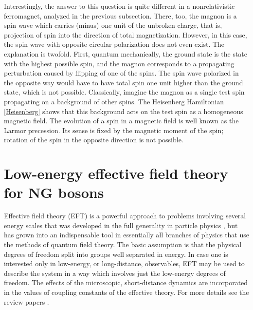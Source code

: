 \documentclass[final,3p,times,12pt,a4paper,sort&compress]{elsarticle}
\begin{document}
Interestingly, the answer to this question is quite different in a
nonrelativistic ferromagnet, analyzed in the previous subsection. There, too,
the magnon is a spin wave which carries (minus) one unit of the unbroken
charge, that is, projection of spin into the direction of total magnetization.
However, in this case, the spin wave with opposite circular polarization does
not even exist. The explanation is twofold. First, quantum mechanically, the
ground state is the state with the highest possible spin, and the magnon
corresponds to a propagating perturbation caused by flipping of one of the
spins. The spin wave polarized in the opposite way would have to have total
spin one unit higher than the ground state, which is not possible. Classically,
imagine the magnon as a single test spin propagating on a background of other
spins. The Heisenberg Hamiltonian \eqref{Heisenberg} shows that this background
acts on the test spin as a homogeneous magnetic field. The evolution of a spin
in a magnetic field is well known as the Larmor precession. Its sense is fixed
by the magnetic moment of the spin; rotation of the spin in the opposite
direction is not possible.


\section{Low-energy effective field theory for NG bosons}
\label{sec:EFT}
Effective field theory (EFT) is a powerful approach to problems involving
several energy scales that was developed in the full generality in particle
physics \cite{Weinberg:1978kz}, but has grown into an indispensable tool in
essentially all branches of physics that use the methods of quantum field
theory. The basic assumption is that the physical degrees of freedom split into
groups well separated in energy. In case one is interested only in
low-energy, or long-distance, observables, EFT may be used to describe the
system in a way which involves just the low-energy degrees of freedom. The
effects of the microscopic, short-distance dynamics are incorporated in the
values of coupling constants of the effective theory. For more details see the
review papers \cite{Georgi:1994qn,Kaplan:1995uv,Manohar:1996cq,Pich:1998xt}.
\end{document}
